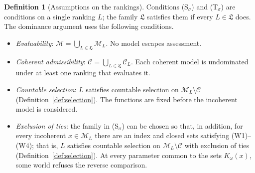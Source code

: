 \documentclass[11pt]{article}
\theoremstyle{definition}
\newtheorem{definition}[theorem]{Definition}
\theoremstyle{remark}
\newcommand{\M}{\mathcal M}
\newcommand{\C}{\mathcal C}
\newcommand{\Lf}{\mathfrak L}
\begin{document}
\begin{definition}[Assumptions on the rankings]\label{def:argument-assumptions}
Conditions (S$_\sigma$) and (T$_\sigma$) are conditions on a single ranking $L$; the family $\Lf$ satisfies them if every $L\in\Lf$ does. The dominance argument uses the following conditions.
\begin{itemize}[leftmargin=3.4em,labelsep=0.5em]
\item[\textbf{(E)}] \emph{Evaluability}: $\M=\bigcup_{L\in\Lf}\M_L$. No model escapes assessment.
\item[\textbf{(A)}] \emph{Coherent admissibility}: $\C=\bigcup_{L\in\Lf}\C_L$. Each coherent model is undominated under at least one ranking that evaluates it.
\item[\textbf{(S$_\sigma$)}] \emph{Countable selection}: $L$ satisfies countable selection on $\M_L\setminus\C$ (Definition~\ref{def:selection}). The functions are fixed before the incoherent model is considered.
\item[\textbf{(T$_\sigma$)}] \emph{Exclusion of ties}: the family in (S$_\sigma$) can be chosen so that, in addition, for every incoherent $x\in\M_L$ there are an index and closed sets satisfying (W1)--(W4); that is, $L$ satisfies countable selection on $\M_L\setminus\C$ with exclusion of ties (Definition~\ref{def:selection}). At every parameter common to the sets $K_\omega(x)$, some world refuses the reverse comparison.
\end{itemize}
\end{definition}
\end{document}
